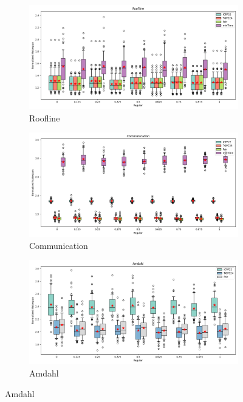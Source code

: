 \documentclass{article}
\begin{document}
\begin{figure}[htbp]
\centering
\begin{subfigure}[b]{0.32\textwidth}\includegraphics[width=\textwidth]{Results/Regular/Regular_Roofline_boxplot}\caption{Roofline}\label{fig:boxplot_figures_Regular_Roofline}\end{subfigure}
\hfill
\begin{subfigure}[b]{0.32\textwidth}\includegraphics[width=\textwidth]{Results/Regular/Regular_Communication_boxplot}\caption{Communication}\label{fig:boxplot_figures_Regular_Communication}\end{subfigure}
\hfill
\begin{subfigure}[b]{0.32\textwidth}\includegraphics[width=\textwidth]{Results/Regular/Regular_Amdahl_boxplot}\caption{Amdahl}\label{fig:boxplot_figures_Regular_Amdahl}\end{subfigure}

\end{figure}
\end{document}
